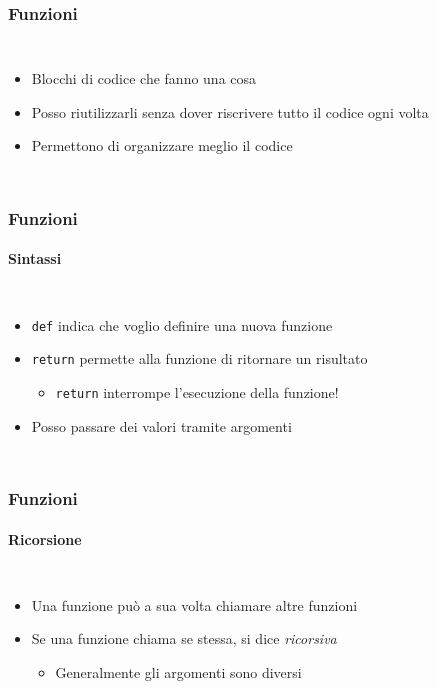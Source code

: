 \begin{contentframe}
    \frametitle{Funzioni}

    \begin{columns}
        \begin{itemize}
            \item Blocchi di codice che fanno una cosa
            \item Posso riutilizzarli senza dover riscrivere tutto il codice ogni volta
            \item Permettono di organizzare meglio il codice
        \end{itemize}
        
        \centering
    \end{columns}
\end{contentframe}

\begin{contentframe}
    \frametitle{Funzioni}
    \framesubtitle{Sintassi}

    \begin{columns}
        \begin{itemize}
            \item \texttt{def} indica che voglio definire una nuova funzione
            \bigskip
            \item \texttt{return} permette alla funzione di ritornare un risultato
            \begin{itemize}
                \item \texttt{return} interrompe l'esecuzione della funzione!
            \end{itemize}
            \bigskip
            \item Posso passare dei valori tramite argomenti
        \end{itemize}
        
        \centering
    \end{columns}
\end{contentframe}

\begin{contentframe}
    \frametitle{Funzioni}
    \framesubtitle{Ricorsione}

    \begin{columns}
        \begin{itemize}
            \item Una funzione può a sua volta chiamare altre funzioni
            \bigskip
            \item Se una funzione chiama se stessa, si dice \textit{ricorsiva}
            \begin{itemize}
                \item Generalmente gli argomenti sono diversi
            \end{itemize}
        \end{itemize}
        
        \centering
    \end{columns}
\end{contentframe}

